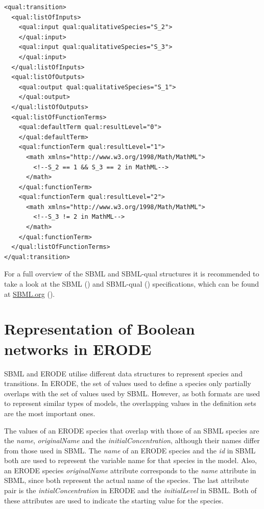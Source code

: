 \begin{lstlisting}[language=SBML, caption=The transition example in SBML-qual (simplified)]
<qual:transition>
  <qual:listOfInputs>
    <qual:input qual:qualitativeSpecies="S_2">
    </qual:input>
    <qual:input qual:qualitativeSpecies="S_3">
    </qual:input>
  </qual:listOfInputs>
  <qual:listOfOutputs>
    <qual:output qual:qualitativeSpecies="S_1">
    </qual:output>
  </qual:listOfOutputs>
  <qual:listOfFunctionTerms>
    <qual:defaultTerm qual:resultLevel="0">
    </qual:defaultTerm>
    <qual:functionTerm qual:resultLevel="1">
	  <math xmlns="http://www.w3.org/1998/Math/MathML">
        <!--S_2 == 1 && S_3 == 2 in MathML-->
	  </math>
    </qual:functionTerm>
    <qual:functionTerm qual:resultLevel="2">
      <math xmlns="http://www.w3.org/1998/Math/MathML">
	    <!--S_3 != 2 in MathML-->
	  </math>
    </qual:functionTerm>
  </qual:listOfFunctionTerms>
</qual:transition>
\end{lstlisting}

For a full overview of the SBML and SBML-qual structures it is recommended to take a look at the SBML (\cite{hucka2018systems}) and SBML-qual (\cite{sbmlqual2015}) specifications, which can be found at \href{http://sbml.org/Documents/Specifications}{SBML.org} (\cite{documents/specifications}).


\section{Representation of Boolean networks in ERODE}
SBML and ERODE utilise different data structures to represent species and transitions. In ERODE, the set of values used to define a species only partially overlaps with the set of values used by SBML. However, as both formats are used to represent similar types of models, the overlapping values in the definition sets are the most important ones.

The values of an ERODE species that overlap with those of an SBML species are the \emph{name}, \emph{originalName} and the \emph{initialConcentration}, although their names differ from those used in SBML.
The \emph{name} of an ERODE species and the \emph{id} in SBML both are used to represent the variable name for that species in the model. Also, an ERODE species \emph{originalName} attribute corresponds to the \emph{name} attribute in SBML, since both represent the actual name of the species. The last attribute pair is the \emph{intialConcentration} in ERODE and the \emph{initialLevel} in SBML. Both of these attributes are used to indicate the starting value for the species.

